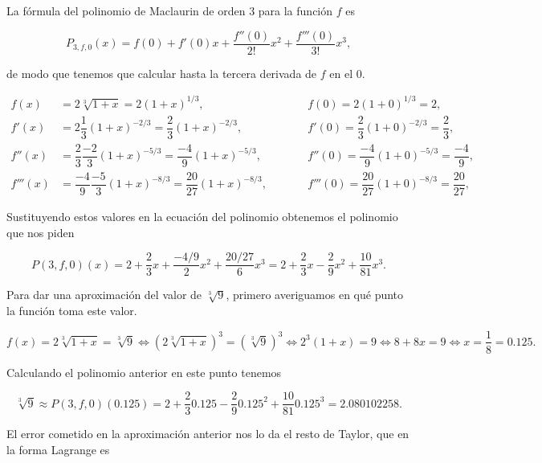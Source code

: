 \documentclass[
  spanish,
  a4paper,
]{scrreport}
\theoremstyle{definition}
\theoremstyle{remark}
\begin{document}
\begin{tcolorbox}[enhanced jigsaw, arc=.35mm, bottomrule=.15mm, bottomtitle=1mm, breakable, colback=white, colbacktitle=quarto-callout-tip-color!10!white, colframe=quarto-callout-tip-color-frame, coltitle=black, left=2mm, leftrule=.75mm, opacityback=0, opacitybacktitle=0.6, rightrule=.15mm, title=\textcolor{quarto-callout-tip-color}{\faLightbulb}\hspace{0.5em}{Solución}, titlerule=0mm, toprule=.15mm, toptitle=1mm]

La fórmula del polinomio de Maclaurin de orden \(3\) para la función
\(f\) es

\[
P_{3,f,0} (x)= f(0) + f'(0)x + \frac{f''(0)}{2!}x^2 + \frac{f'''(0)}{3!}x^3,
\]

de modo que tenemos que calcular hasta la tercera derivada de \(f\) en
el 0.

\begin{align*}
f(x) &= 2\sqrt[3]{{1 + x}}=2(1+x)^{1/3}, & \quad \quad & f(0) = 2(1+0)^{1/3}=2,  \\
f'(x) &= 2\dfrac{1}{3}(1+x)^{-2/3}=\dfrac{2}{3}(1+x)^{-2/3}, &  & f'(0) = \dfrac{2}{3}(1+0)^{-2/3}=\dfrac{2}{3},\\
f''(x) &= \dfrac{2}{3}\dfrac{-2}{3}(1+x)^{-5/3}=\dfrac{-4}{9}(1+x)^{-5/3}, &  & f''(0) = \dfrac{-4}{9}(1+0)^{-5/3}=\dfrac{-4}{9},\\
f'''(x) &= \dfrac{-4}{9}\dfrac{-5}{3}(1+x)^{-8/3}=\dfrac{20}{27}(1+x)^{-8/3}, &  & f'''(0) = \dfrac{20}{27}(1+0)^{-8/3}=\dfrac{20}{27},
\end{align*}

Sustituyendo estos valores en la ecuación del polinomio obtenemos el
polinomio que nos piden

\[
P(3,f,0)(x)
= 2+\frac{2}{3}x+\frac{-4/9}{2}x^2+\frac{20/27}{6}x^3
=2+\frac{2}{3}x-\frac{2}{9}x^2+\frac{10}{81}x^3.
\]

Para dar una aproximación del valor de \(\sqrt[3]{9}\), primero
averiguamos en qué punto la función toma este valor.

\[
f(x)=2\sqrt[3]{1+x}=\sqrt[3]{9} 
\Leftrightarrow (2\sqrt[3]{1+x})^3=(\sqrt[3]{9})^3 
\Leftrightarrow 2^3(1+x)=9 \Leftrightarrow 8+8x=9 
\Leftrightarrow x=\frac{1}{8}=0.125.
\]

Calculando el polinomio anterior en este punto tenemos

\[
\sqrt[3]{9}\approx P(3,f,0)(0.125)= 2+\frac{2}{3}0.125-\frac{2}{9}0.125^2+\frac{10}{81}0.125^3=2.080102258.
\]

El error cometido en la aproximación anterior nos lo da el resto de
Taylor, que en la forma Lagrange es


\end{tcolorbox}
\end{document}
